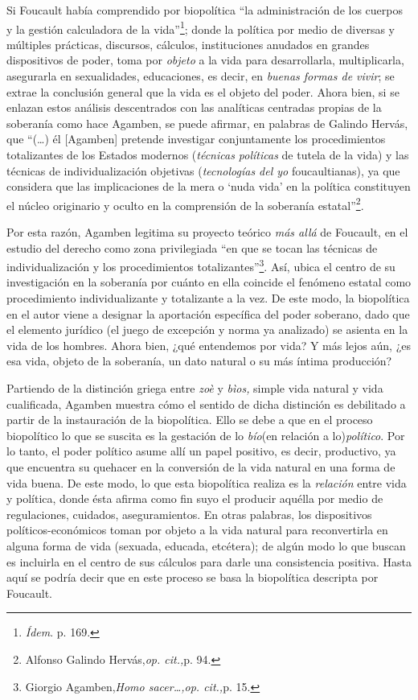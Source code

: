 Si Foucault había comprendido por biopolítica \enquote{la administración de los cuerpos y la gestión calculadora de la vida}\footnote{\emph{Ídem}. p. 169.}; donde la política por medio de diversas y múltiples prácticas, discursos, cálculos, instituciones anudados en grandes dispositivos de poder, toma por \emph{objeto} a la vida para desarrollarla, multiplicarla, asegurarla en sexualidades, educaciones, es decir, en \emph{buenas formas de vivir}; se extrae la conclusión general que la vida es el objeto del poder. Ahora bien, si se enlazan estos análisis descentrados con las analíticas centradas propias de la soberanía como hace Agamben, se puede afirmar, en palabras de Galindo Hervás, que \enquote{(\dots) él {[}Agamben{]} pretende investigar conjuntamente los procedimientos totalizantes de los Estados modernos (\emph{técnicas políticas} de tutela de la vida) y las técnicas de individualización objetivas (\emph{tecnologías del yo} foucaultianas), ya que considera que las implicaciones de la mera o \enquote{nuda vida} en la política constituyen el núcleo originario y oculto en la comprensión de la soberanía estatal}\footnote{Alfonso Galindo Hervás,\emph{op. cit.,}p. 94.}.

Por esta razón, Agamben legitima su proyecto teórico \emph{más allá} de Foucault, en el estudio del derecho como zona privilegiada \enquote{en que se tocan las técnicas de individualización y los procedimientos totalizantes}\footnote{Giorgio Agamben,\emph{Homo sacer\ldots,op. cit.,}p. 15.}. Así, ubica el centro de su investigación en la soberanía por cuánto en ella coincide el fenómeno estatal como procedimiento individualizante y totalizante a la vez. De este modo, la biopolítica en el autor viene a designar la aportación específica del poder soberano, dado que el elemento jurídico (el juego de excepción y norma ya analizado) se asienta en la vida de los hombres. Ahora bien, ¿qué entendemos por vida? Y más lejos aún, ¿es esa vida, objeto de la soberanía, un dato natural o su más íntima producción?

Partiendo de la distinción griega entre \emph{zoè} y \emph{bìos,} simple vida natural y vida cualificada, Agamben muestra cómo el sentido de dicha distinción es debilitado a partir de la instauración de la biopolítica. Ello se debe a que en el proceso biopolítico lo que se suscita es la gestación de lo \emph{bío}(en relación a lo)\emph{político}. Por lo tanto, el poder político asume allí un papel positivo, es decir, productivo, ya que encuentra su quehacer en la conversión de la vida natural en una forma de vida buena. De este modo, lo que esta biopolítica realiza es la \emph{relación} entre vida y política, donde ésta afirma como fin suyo el producir aquélla por medio de regulaciones, cuidados, aseguramientos. En otras palabras, los dispositivos políticos-económicos toman por objeto a la vida natural para reconvertirla en alguna forma de vida (sexuada, educada, etcétera); de algún modo lo que buscan es incluirla en el centro de sus cálculos para darle una consistencia positiva. Hasta aquí se podría decir que en este proceso se basa la biopolítica descripta por Foucault.

